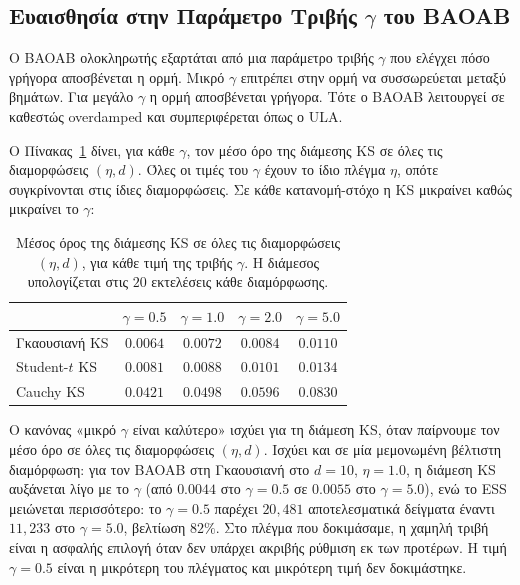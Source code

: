 \subsection{Ευαισθησία στην Παράμετρο Τριβής $\gamma$ του BAOAB}
\label{sec:gamma-sensitivity}

Ο BAOAB ολοκληρωτής εξαρτάται από μια παράμετρο τριβής $\gamma$ που ελέγχει
πόσο γρήγορα αποσβένεται η ορμή. Μικρό $\gamma$ επιτρέπει στην ορμή να
συσσωρεύεται μεταξύ βημάτων. Για μεγάλο $\gamma$
η ορμή αποσβένεται γρήγορα. Τότε ο BAOAB λειτουργεί σε καθεστώς overdamped και συμπεριφέρεται όπως ο ULA.

Ο Πίνακας~\ref{tab:gamma-mean} δίνει, για κάθε $\gamma$, τον μέσο όρο της διάμεσης
KS σε όλες τις διαμορφώσεις $(\eta, d)$. Όλες οι τιμές του $\gamma$ έχουν το ίδιο
πλέγμα $\eta$, οπότε συγκρίνονται στις ίδιες διαμορφώσεις. Σε κάθε κατανομή-στόχο
η KS μικραίνει καθώς μικραίνει το $\gamma$:

\begin{table}[H]
\centering
\small
\begin{tabular}{lcccc}
\toprule
                & $\gamma = 0.5$ & $\gamma = 1.0$ & $\gamma = 2.0$ & $\gamma = 5.0$ \\
\midrule
Γκαουσιανή KS     & $0.0064$ & $0.0072$ & $0.0084$ & $0.0110$ \\
Student-$t$ KS  & $0.0081$ & $0.0088$ & $0.0101$ & $0.0134$ \\
Cauchy KS       & $0.0421$ & $0.0498$ & $0.0596$ & $0.0830$ \\
\bottomrule
\end{tabular}
\caption{Μέσος όρος της διάμεσης KS σε όλες τις διαμορφώσεις $(\eta, d)$, για κάθε
τιμή της τριβής $\gamma$. Η διάμεσος υπολογίζεται στις $20$ εκτελέσεις κάθε
διαμόρφωσης.}
\label{tab:gamma-mean}
\end{table}

Ο κανόνας «μικρό $\gamma$ είναι καλύτερο» ισχύει για τη διάμεση KS, όταν
παίρνουμε τον μέσο όρο σε όλες τις διαμορφώσεις $(\eta, d)$. Ισχύει και σε μία μεμονωμένη βέλτιστη
διαμόρφωση: για τον BAOAB στη Γκαουσιανή στο $d=10$, $\eta=1.0$, η διάμεση KS
αυξάνεται λίγο με το $\gamma$ (από $0.0044$ στο $\gamma=0.5$ σε $0.0055$ στο
$\gamma=5.0$), ενώ το ESS μειώνεται περισσότερο: το $\gamma=0.5$ παρέχει $20{,}481$
αποτελεσματικά δείγματα έναντι $11{,}233$ στο $\gamma=5.0$, βελτίωση $82\%$.
Στο πλέγμα που δοκιμάσαμε, η χαμηλή τριβή είναι η ασφαλής επιλογή όταν
δεν υπάρχει ακριβής ρύθμιση εκ των προτέρων. Η τιμή $\gamma=0.5$ είναι η
μικρότερη του πλέγματος και μικρότερη τιμή δεν δοκιμάστηκε.

